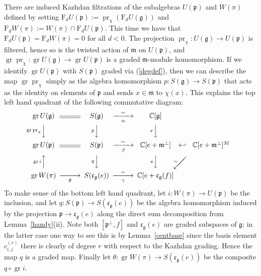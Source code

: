 \documentclass[twoside,12pt,reqno]{amsart}
\def\C{{\mathbb C}}
\def\F{\mathrm{F}}
\def\pr{{\operatorname{pr}}}
\def\gr{\operatorname{gr}}
\begin{document}
There are induced Kazhdan filtrations of the subalgebras
$U(\mathfrak p)$  and $W(\pi)$ defined by
setting $\F_d U(\mathfrak{p}) := \pr_\chi (\F_d U(\mathfrak{g}))$
and $\F_d W(\pi) := W(\pi) \cap \F_d U(\mathfrak{p})$.
This time we have that
$\F_d  U(\mathfrak{p})= \F_d W(\pi) = 0$ for all $d < 0$.
The projection $\pr_\chi:U(\mathfrak{g}) \rightarrow U(\mathfrak{p})$ 
is filtered, hence so is the 
twisted action of $\mathfrak{m}$ on $U(\mathfrak{p})$,
and
$\gr \pr_\chi:\gr U(\mathfrak{g}) \rightarrow \gr U(\mathfrak{p})$
is a graded $\mathfrak{m}$-module homomorphism.
If we identify $\gr U(\mathfrak{p})$ with $S(\mathfrak{p})$
graded via (\ref{degdef}),
then we can describe the
map $\gr \pr_\chi$ simply as the algebra homomorphism
$p:S(\mathfrak{g}) \rightarrow S(\mathfrak{p})$
that acts as the identity on elements of $\mathfrak{p}$
and sends $x \in \mathfrak{m}$ to $\chi(x)$.
This explains the top left hand quadrant of the following 
commutative diagram:
\begin{equation}\label{thed}
\begin{CD}
\gr U(\mathfrak{g}) & @= &S(\mathfrak{g}) &@>\sim>\alpha> & \C[\mathfrak g]\\
@V\gr\pr_\chi VV &&@VpVV&& @VrVV\\
\gr U(\mathfrak{p}) &@= &S(\mathfrak{p}) &@>\sim>\beta> & \C[e+\mathfrak{m}^\perp]&\:\:\:\hookleftarrow\:\:\:\: &\C[e+\mathfrak{m}^\perp]^M\\
@A\gr iAA&&@VqVV&&@VsVV\\
\gr W(\pi)&@>>\theta>&S(\mathfrak{c}_{\mathfrak{g}}(e))&@>\sim>\gamma>&\C[e+\mathfrak{c}_{\mathfrak{g}}(f)]
\end{CD}
\begin{picture}(0,0)
\put(-75,-24){\line(1,1){13}}
\put(-75,-24){\makebox(0,0){$\swarrow$}}
\put(-77,-18){\makebox(0,0){$_{\sim}$}}
\end{picture}
\end{equation}
To make sense of the bottom left hand quadrant,
let $i:W(\pi) \rightarrow U(\mathfrak{p})$ be the inclusion,
and let
$q:S(\mathfrak{p}) \rightarrow S(\mathfrak{c}_{\mathfrak{g}}(e))$
be the algebra homomorphism induced
by the projection $\mathfrak{p}\rightarrow\mathfrak{c}_{\mathfrak{g}}(e)$
along the direct sum decomposition from Lemma~\ref{handy}(ii).
Note both $[\mathfrak{p}^\perp,f]$ and $\mathfrak{c}_{\mathfrak{g}}(e)$
are graded subspaces of $\mathfrak{g}$; in the latter case
one way to see this is by Lemma~\ref{centbase} 
since the basis element $c_{i,j}^{(r)}$
there is clearly of degree $r$ with respect to the Kazhdan grading.
Hence the map $q$ is a graded map. Finally let
$\theta:\gr W(\pi) \rightarrow S(\mathfrak{c}_{\mathfrak{g}}(e))$ 
be the composite $q \circ \gr i$.
\end{document}
